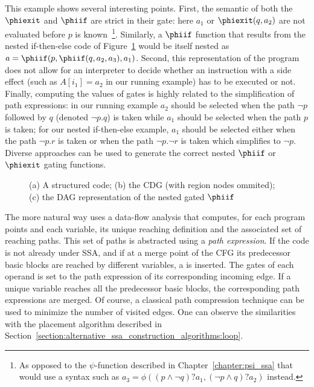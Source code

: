 This example shows several interesting points. First, the semantic of both the $\phiexit$ and $\phiif$ are strict in their gate: here $a_1$ or $\phiexit(q,a_2)$ are not evaluated before $p$ is known~\footnote{As opposed to the $\psi$-function described in Chapter~\ref{chapter:psi_ssa} that would use a syntax such as $a_3=\phi((p\wedge \lnot q)?a_1, (\lnot p\wedge q)?a_2)$ instead.}. Similarly, a $\phiif$ function that results from the nested if-then-else code of Figure~\ref{fig:vsdg:structured} would be itself nested as $a=\phiif(p,\phiif(q,a_2,a_3),a_1)$. Second, this representation of the program does not allow for an interpreter to decide whether an instruction with a side effect (such as $A[i_1]=a_2$ in our running example) has to be executed or not. Finally, computing the values of gates is highly related to the simplification of path expressions: in our running example $a_2$ should be selected when the path $\lnot p$ followed by $q$ (denoted $\lnot p . q$) is taken while $a_1$ should be selected when the path $p$ is taken; for our nested if-then-else example, $a_1$ should be selected either when the path $\lnot p . r$ is taken or when the path $\lnot p . \lnot r$ is taken which simplifies to $\lnot p$. 
Diverse approaches can be used to generate the correct nested $\phiif$ or $\phiexit$ gating functions. 

\begin{figure}
\caption{(a) A structured code; (b) the CDG (with region nodes ommited); (c) the DAG representation of the nested gated $\phiif$ \label{fig:vsdg:structured}}
\end{figure}

The more natural way uses a data-flow analysis that computes, for each program points and each variable, its unique reaching definition and the associated set of reaching paths. This set of paths is abstracted using a \emph{path expression}. If the code is not already under SSA, and if at a merge point of the CFG its predecessor basic blocks are reached by different variables, a \phifun is inserted. The gates of each operand is set to the path expression of its corresponding incoming edge. If a unique variable reaches all the predecessor basic blocks, the corresponding path expressions are merged. Of course, a classical path compression technique can be used to minimize the number of visited edges. One can observe the similarities with the \phifun placement algorithm described in Section~\ref{section:alternative_ssa_construction_algorithms:loop}. 

